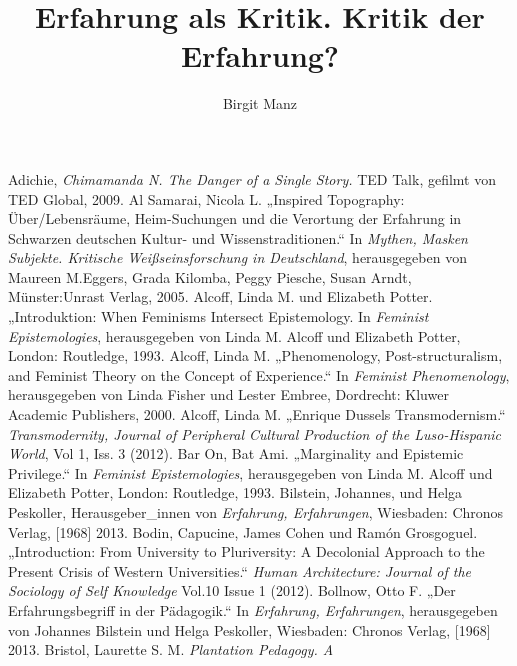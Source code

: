 \documentclass[11pt]{article}
\title{Erfahrung als Kritik. Kritik der Erfahrung?}
\author{Birgit Manz}
\begin{document}
\onehalfspacing
\setlength{\epigraphwidth}{0.7\textwidth}


%
%

%
%
%
%
%
%
%

\begin{thebibliography}{100} %
  Adichie, \emph{Chimamanda N. The Danger of a Single Story.} TED Talk, gefilmt von TED Global, 2009. 
 Al Samarai, Nicola L. „Inspired Topography: Über/Lebensräume, Heim-Suchungen und die
Verortung der Erfahrung in Schwarzen deutschen Kultur- und Wissenstraditionen.“
In \emph{Mythen, Masken Subjekte. Kritische Weißseinsforschung in Deutschland}, herausgegeben von Maureen M.Eggers, Grada Kilomba, Peggy Piesche, Susan Arndt, Münster:Unrast Verlag, 2005.
 Alcoff, Linda M. und Elizabeth Potter. „Introduktion: When Feminisms Intersect Epistemology. In
\emph{Feminist Epistemologies}, herausgegeben von Linda M. Alcoff und Elizabeth Potter, London: Routledge, 1993.
 Alcoff, Linda M. „Phenomenology, Post-structuralism, and Feminist Theory on the Concept of
Experience.“ In \emph{Feminist Phenomenology}, herausgegeben von Linda Fisher und Lester Embree, Dordrecht: Kluwer Academic Publishers, 2000.
 Alcoff, Linda M. „Enrique Dussels Transmodernism.“ \emph{Transmodernity, Journal of Peripheral
Cultural Production of the Luso-Hispanic World}, Vol 1, Iss. 3 (2012).
 Bar On, Bat Ami. „Marginality and Epistemic Privilege.“ In
\emph{Feminist Epistemologies},
herausgegeben von Linda M. Alcoff und Elizabeth Potter, London: Routledge, 1993.
 Bilstein, Johannes, und  Helga Peskoller, Herausgeber\_innen von
\emph{Erfahrung, Erfahrungen}, Wiesbaden: Chronos Verlag, [1968] 2013.
 Bodin, Capucine, James Cohen und Ramón Grosgoguel. „Introduction: From University to
Pluriversity: A Decolonial Approach to the Present Crisis of Western
Universities.“ \emph{Human Architecture: Journal of the Sociology of Self
Knowledge} Vol.10 Issue 1 (2012).
 Bollnow, Otto F. „Der Erfahrungsbegriff in der Pädagogik.“ In
\emph{Erfahrung, Erfahrungen},
herausgegeben von Johannes Bilstein und Helga Peskoller, Wiesbaden: Chronos Verlag, [1968] 2013.
 Bristol, Laurette S. M. \emph{Plantation Pedagogy. A
}
\end{thebibliography}
\end{document}
